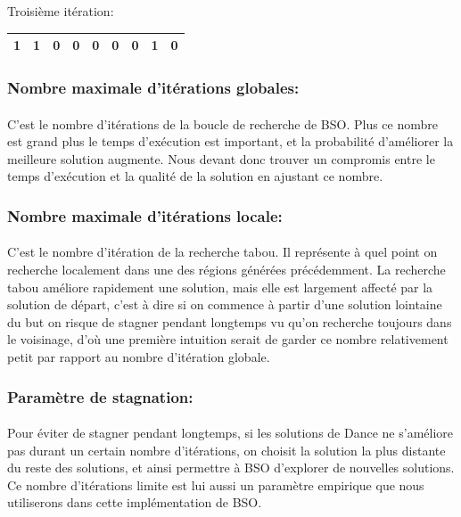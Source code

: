 	Troisième itération:
	
	\begin{center}
		\begin{tabular}{| c| c| c| c| c| c| c| c| c|}
			\hline
			1& 1 &\cellcolor{green!60}0 & 0 & 0 &\cellcolor{green!60}0 & 0 & 1 &\cellcolor{green!60}0\\\hline
		\end{tabular}
	\end{center}
	
	\subsubsection{Nombre maximale d'itérations globales:}
	\paragraph{}
	C’est le nombre d’itérations de la boucle de recherche de BSO. Plus ce nombre est grand plus le temps d’exécution est important, et la probabilité d’améliorer la meilleure solution augmente. Nous devant donc trouver un compromis entre le temps d’exécution et la qualité de la solution en ajustant ce nombre.
	\subsubsection{Nombre maximale d’itérations locale:}
	\paragraph{}
	C’est le nombre d’itération de la recherche tabou. Il représente à quel point on recherche localement dans une des régions générées précédemment. La recherche tabou améliore rapidement une solution, mais elle est largement affecté par la solution de départ, c’est à dire si on commence à partir d’une solution lointaine du but on risque de stagner pendant longtemps vu qu’on recherche toujours dans le voisinage, d’où une première intuition serait de garder ce nombre relativement petit par rapport au nombre d’itération globale.
	
	\subsubsection{Paramètre de stagnation:}
	\paragraph{}Pour éviter de stagner pendant longtemps, si les solutions de Dance ne s’améliore pas durant un certain nombre d’itérations, on choisit la solution la plus distante du reste des solutions, et ainsi permettre à BSO d’explorer de nouvelles solutions. Ce nombre d’itérations limite est lui aussi un paramètre empirique que nous utiliserons dans cette implémentation de BSO.
	
